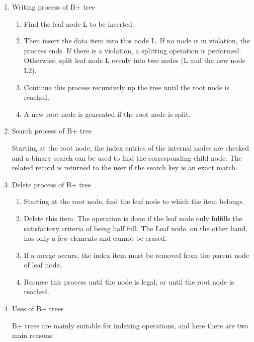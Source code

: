 \begin{enumerate}
\item Writing process of B+ tree
\begin{enumerate}[label=\arabic*)]
    \item Find the leaf node L to be inserted\cite{johnny_2016}.
    \item Then insert the data item into this node L. If no node is in violation, the process ends. If there is a violation, a splitting operation is performed. Otherwise, split leaf node L evenly into two nodes (L and the new node L2)\cite{walker_2021}.
    \item Continue this process recursively up the tree until the root node is reached.
    \item A new root node is generated if the root node is split.
\end{enumerate}


\item Search process of B+ tree

Starting at the root node, the index entries of the internal nodes are checked and a binary search can be used to find the corresponding child node. The related record is returned to the user if the search key is an exact match\cite{walker_2021}.

\item Delete process of B+ tree

\begin{enumerate}[label=\arabic*)]
    \item Starting at the root node, find the leaf node to which the item belongs.
    \item Delete this item. The operation is done if the leaf node only fulfills the satisfactory criteria of being half full. The Leaf node, on the other hand, has only a few elements and cannot be erased\cite{walker_2021}.
    \item If a merge occurs, the index item must be removed from the parent node of leaf node.
    \item Recurse this process until the node is legal, or until the root node is reached\cite{walker_2021}.
\end{enumerate}


\item Uses of B+ trees

B+ trees are mainly suitable for indexing operations, and here there are two main reasons. 


\end{enumerate}
